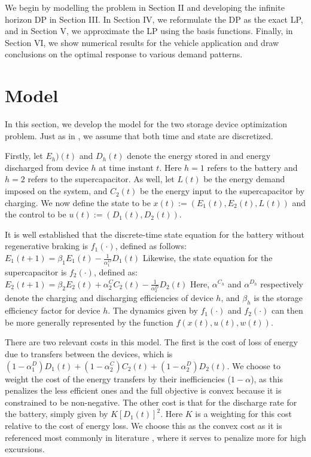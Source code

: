 \documentclass[conference]{IEEEtran}
\begin{document}
We begin by modelling the problem in Section II and developing the infinite horizon DP in Section III. In Section IV, we reformulate the DP as the exact LP, and in Section V, we approximate the LP using the basis functions. Finally, in Section VI, we show numerical results for the vehicle application and draw conclusions on the optimal response to various demand patterns. 

\section{Model}
In this section, we develop the model for the two storage device optimization problem. Just as in \cite{su2013modeling}, we assume that both time and state are discretized.

Firstly, let $E_{h})(t)$ and $D_{h}(t)$ denote the energy stored in and energy discharged from device $h$ at time instant $t$. Here $h=1$ refers to the battery and $h=2$ refers to the supercapacitor. As well, let $L(t)$ be the energy demand imposed on the system, and $C_{2}(t)$ be the energy input to the supercapacitor by charging. We now define the state to be $x(t):=(E_{1}(t),E_{2}(t),L(t))$ and the control to be $u(t):=(D_{1}(t),D_{2}(t))$.

It is well established that the discrete-time state equation for the battery without regenerative braking is $f_{1}(\cdot)$, defined as follows:
\begin{math}E_{1}(t+1)=\beta_{1}E_{1}(t)-\frac{1}{\alpha_{1}^{D}}D_{1}(t)\end{math} Likewise, the state equation for the supercapacitor is $f_{2}(\cdot)$, defined as:
\begin{math}E_{2}(t+1)=\beta_{2}E_{2}(t)+\alpha_{2}^{C}C_{2}(t)-\frac{1}{\alpha_{2}^{D}}D_{2}(t)\end{math} Here, $\alpha^{C_{h}}$ and $\alpha^{D_{h}}$ respectively denote the charging and discharging efficiencies of device $h$, and $\beta_{h}$ is the storage efficiency factor for device $h$. The dynamics given by $f_{1}(\cdot)$ and $f_{2}(\cdot)$ can then be more generally represented by the function $f(x(t),u(t),w(t))$.

There are two relevant costs in this model. The first is the cost of loss of energy due to transfers between the devices, which is $(1-\alpha_{1}^{D})D_{1}(t)+(1-\alpha_{2}^{C})C_{2}(t)+(1-\alpha_{2}^{D})D_{2}(t)$. We choose to weight the cost of the energy transfers by their inefficiencies ($1-\alpha$), as this penalizes the less efficient ones and the full objective is convex because it is constrained to be non-negative. The other cost is that for the discharge rate for the battery, simply given by $K\left[D_{1}(t)\right]^{2}$. Here $K$ is a weighting for this cost relative to the cost of energy loss. We choose this as the convex cost as it is referenced most commonly in literature \cite{bambang2014energy}, where it serves to penalize more for high excursions.
\end{document}
